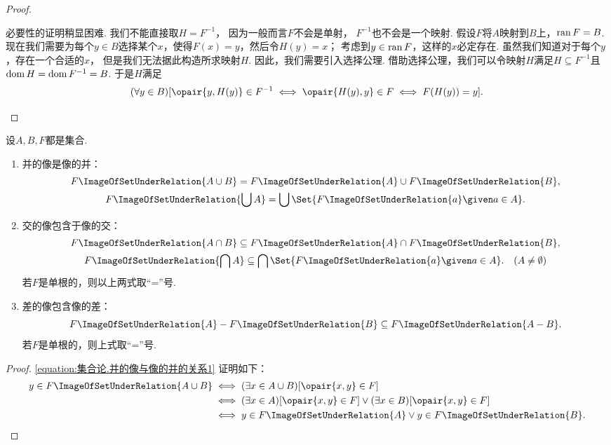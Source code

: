 \begin{theorem}
\begin{proof}
\begin{enumerate}
	必要性的证明稍显困难.
	我们不能直接取\(H = F^{-1}\)，
	因为一般而言\(F\)不会是单射，
	\(F^{-1}\)也不会是一个映射.
	假设\(F\)将\(A\)映射到\(B\)上，\(\operatorname{ran} F = B\).
	现在我们需要为每个\(y \in B\)选择某个\(x\)，使得\(F(x) = y\)，然后令\(H(y) = x\)；
	考虑到\(y \in \operatorname{ran} F\)，这样的\(x\)必定存在.
	虽然我们知道对于每个\(y\)，存在一个合适的\(x\)，
	但是我们无法据此构造所求映射\(H\).
	因此，我们需要引入选择公理.
	借助选择公理，我们可以令映射\(H\)满足\(H \subseteq F^{-1}\)且\(\operatorname{dom} H = \operatorname{dom} F^{-1} = B\).
	于是\(H\)满足\[
		(\forall y \in B)
		[
			\opair{y,H(y)} \in F^{-1}
			\iff
			\opair{H(y),y} \in F
			\iff
			F(H(y)) = y
		].
		\qedhere
	\]
\end{enumerate}
\end{proof}
\end{theorem}

\begin{theorem}
设\(A,B,F\)都是集合.
\def\F#1{F\ImageOfSetUnderRelation{#1}}
\begin{enumerate}
	\item 并的像是像的并：\begin{gather}
		\F{A \cup B}
		= \F{A} \cup \F{B},
		\label{equation:集合论.并的像与像的并的关系1} \\
		\F{\bigcup A}
		= \bigcup\Set{ \F{a} \given a \in A }.
		\label{equation:集合论.并的像与像的并的关系2}
	\end{gather}

	\item 交的像包含于像的交：\begin{gather}
		\F{A \cap B}
		\subseteq \F{A} \cap \F{B},
		\label{equation:集合论.交的像与像的交的关系1} \\
		\F{\bigcap A}
		\subseteq \bigcap\Set{ \F{a} \given a \in A }.
		\label{equation:集合论.交的像与像的交的关系2}
		\quad(A \neq \emptyset)
	\end{gather}
	若\(F\)是单根的，则以上两式取“=”号.

	\item 差的像包含像的差：\begin{equation}
		\F{A} - \F{B}
		\subseteq \F{A-B}.
		\label{equation:集合论.差的像与像的差的关系}
	\end{equation}
	若\(F\)是单根的，则上式取“=”号.
\end{enumerate}
\begin{proof}
\cref{equation:集合论.并的像与像的并的关系1} 证明如下：
\begin{align*}
	y \in \F{A \cup B}
	&\iff (\exists x \in A \cup B)[\opair{x,y} \in F] \\
	&\iff (\exists x \in A)[\opair{x,y} \in F]
			\lor (\exists x \in B)[\opair{x,y} \in F] \\
	&\iff y \in \F{A} \lor y \in \F{B}.
\end{align*}


\end{proof}
\end{theorem}
